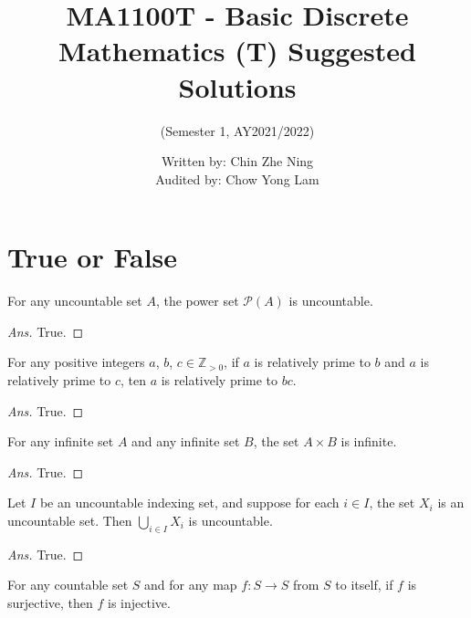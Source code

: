 \documentclass[12pt]{article}
\newenvironment{problem}[2][Problem]{\begin{trivlist}
\item[\hskip \labelsep {\bfseries #1}\hskip \labelsep {\bfseries #2.}]}{\end{trivlist}}
\begin{document}
\setlength{\parindent}{0pt}
 
\title{MA1100T - Basic Discrete Mathematics (T) Suggested Solutions}
\author{(Semester 1, AY2021/2022)}
\date{Written by: Chin Zhe Ning\\Audited by: Chow Yong Lam}
\maketitle
 
\section{True or False}
\begin{problem}{1}
For any uncountable set $A$, the power set $\mathcal{P}(A)$ is uncountable.
\end{problem}

\begin{proof}[Ans]
True.

\end{proof}

\begin{problem}{2}
For any positive integers $a$, $b$, $c \in \mathbb{Z}_{> 0}$, if $a$ is relatively prime to $b$ and $a$ is relatively prime to $c$, ten $a$ is relatively prime to $bc$.
\end{problem}

\begin{proof}[Ans]
True.

\end{proof}

\begin{problem}{3}
For any infinite set $A$ and any infinite set $B$, the set $A \times B$ is infinite.
\end{problem}

\begin{proof}[Ans]
True.

\end{proof}

\begin{problem}{4}
Let $I$ be an uncountable indexing set, and suppose for each $i \in I$, the set $X_i$ is an uncountable set. Then $\bigcup_{i \in I} X_{i}$ is uncountable.
\end{problem}

\begin{proof}[Ans]
True.

\end{proof}

\begin{problem}{5}
For any countable set $S$ and for any map $f : S \rightarrow S$ from $S$ to itself, if $f$ is surjective, then $f$ is injective. 
\end{problem}
\end{document}
